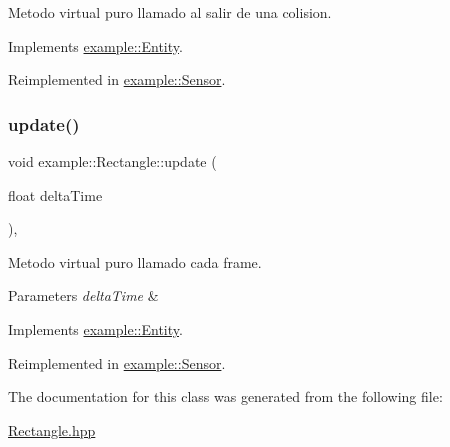 Metodo virtual puro llamado al salir de una colision. 



Implements \mbox{\hyperlink{classexample_1_1_entity_ae5d520b5f0dda6bb56a6c74eaf1c850c}{example\+::\+Entity}}.



Reimplemented in \mbox{\hyperlink{classexample_1_1_sensor_a0bc1b5c11b00ac855c35863ffc9c70d9}{example\+::\+Sensor}}.

\mbox{\label{classexample_1_1_rectangle_a346951183565830ee4b262c8c66f2673}} 
\subsubsection{\texorpdfstring{update()}{update()}}
{\footnotesize\ttfamily void example\+::\+Rectangle\+::update (\begin{DoxyParamCaption}\item[{float}]{delta\+Time }\end{DoxyParamCaption})\hspace{0.3cm}{\ttfamily [override]}, {\ttfamily [virtual]}}



Metodo virtual puro llamado cada frame. 


\begin{DoxyParams}{Parameters}
{\em delta\+Time} & \\
\hline
\end{DoxyParams}


Implements \mbox{\hyperlink{classexample_1_1_entity_a5dded5c361451f2cfdf7ed3c7de1194f}{example\+::\+Entity}}.



Reimplemented in \mbox{\hyperlink{classexample_1_1_sensor_a6db61100875509315537c46418fbc250}{example\+::\+Sensor}}.



The documentation for this class was generated from the following file\+:\begin{DoxyCompactItemize}
\item 
\mbox{\hyperlink{_rectangle_8hpp}{Rectangle.\+hpp}}\end{DoxyCompactItemize}

